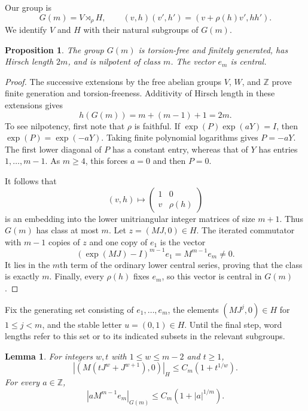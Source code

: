 \documentclass[11pt,letterpaper]{amsart}
\numberwithin{equation}{section}
\newtheorem{proposition}[theorem]{Proposition}
\newtheorem{lemma}[theorem]{Lemma}
\theoremstyle{remark}
\newcommand{\Z}{\mathbb Z}
\begin{document}
Our group is
\begin{equation}\label{eq:Gm}
 G(m)=V\rtimes_\rho H,\qquad
 (v,h)(v',h')=(v+\rho(h)v',hh').
\end{equation}
We identify $V$ and $H$ with their natural subgroups of $G(m)$.

\begin{proposition}\label{prop:group}
The group $G(m)$ is torsion-free and finitely generated, has Hirsch
length $2m$, and is nilpotent of class $m$. The vector $e_m$ is central.
\end{proposition}

\begin{proof}
The successive extensions by the free abelian groups $V$, $W$, and
$\Z$ prove finite generation and torsion-freeness. Additivity of Hirsch
length in these extensions gives
\[
 h(G(m))=m+(m-1)+1=2m.
\]
To see nilpotency, first note that $\rho$ is faithful. If
$\exp(P)\exp(aY)=I$, then $\exp(P)=\exp(-aY)$. Taking finite
polynomial logarithms gives $P=-aY$. The first lower diagonal of $P$
has a constant entry, whereas that of $Y$ has entries $1,\ldots,m-1$.
As $m\ge4$, this forces $a=0$ and then $P=0$.

It follows that
\begin{equation}\label{eq:affine}
 (v,h)\longmapsto
 \begin{pmatrix}1&0\\v&\rho(h)\end{pmatrix}
\end{equation}
is an embedding into the lower unitriangular integer matrices of size
$m+1$. Thus $G(m)$ has class at most $m$. Let $z=(MJ,0)\in H$.
The iterated commutator with $m-1$ copies of $z$ and one copy of $e_1$
is the vector
\[
 (\exp(MJ)-I)^{m-1}e_1=M^{m-1}e_m\ne0.
\]
It lies in the $m$th term of the ordinary lower central series, proving
that the class is exactly $m$. Finally, every $\rho(h)$ fixes $e_m$,
so this vector is central in $G(m)$.
\end{proof}

Fix the generating set consisting of $e_1,\ldots,e_m$, the elements
$(MJ^j,0)\in H$ for $1\le j<m$, and the stable letter
$u=(0,1)\in H$. Until the final step, word lengths refer to this set
or to its indicated subsets in the relevant subgroups.

\begin{lemma}\label{lem:groupcompression}
For integers $w,t$ with $1\le w\le m-2$ and $t\ge1$,
\begin{equation}\label{eq:actinglength}
 |(M(tJ^w+J^{w+1}),0)|_H\le C_m(1+t^{1/w}).
\end{equation}
For every $a\in\Z$,
\begin{equation}\label{eq:centrallength}
 |aM^{m-1}e_m|_{G(m)}\le C_m(1+|a|^{1/m}).
\end{equation}
\end{lemma}
\end{document}
